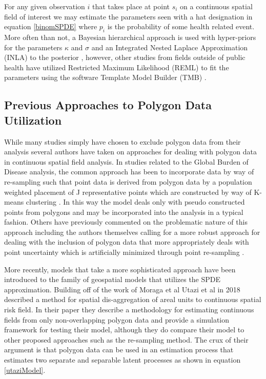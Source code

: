 \documentclass{article}
\begin{document}
For any given observation $i$ that takes place at point $s_i$ on a continuous spatial field of interest we may estimate the parameters seen with a hat designation in equation \ref{binomSPDE} where $p_i$ is the probability of some health related event. More often than not, a Bayesian hierarchical approach is used with hyper-priors for the parameters $\kappa$ and $\sigma$ \cite{Burke2016, Reiner2018, Utazi2018a, Wakefield2017} and an Integrated Nested Laplace Approximation (INLA) to the posterior \cite{Rue2009}, however, other studies from fields outside of public health have utilized Restricted Maximum Likelihood (REML) to fit the parameters \cite{Gruss2018} using the software Template Model Builder (TMB) \cite{Kristensen2016a}.

\subsection{Previous Approaches to Polygon Data Utilization}

While many studies simply have chosen to exclude polygon data from their analysis several authors have taken on approaches for dealing with polygon data in continuous spatial field analysis. In studies related to the Global Burden of Disease analysis, the common approach has been to incorporate data by way of re-sampling such that point data is derived from polygon data by a population weighted placement of J representative points which are constructed by way of K-means clustering \cite{Golding2017, Reiner2018}. In this way the model deals only with pseudo constructed points from polygons and may be incorporated into the analysis in a typical fashion. Others have previously commented on the problematic nature of this approach \cite{Wakefield2017} including the authors themselves calling for a more robust approach for dealing with the inclusion of polygon data that more appropriately deals with point uncertainty which is artificially minimized through point re-sampling \cite{Golding2017}.

More recently, models that take a more sophisticated approach have been introduced to the family of geospatial models that utilizes the SPDE approximation. Building off of the work of Moraga et al \cite{Moraga2017} Utazi et al in 2018 described a method for spatial dis-aggregation of areal units to continuous spatial risk field. In their paper they describe a methodology for estimating continuous fields from only non-overlapping polygon data and provide a simulation framework for testing their model, although they do compare their model to other proposed approaches such as the re-sampling method. The crux of their argument is that polygon data can be used in an estimation process that estimates two separate and separable latent processes as shown in equation \ref{utaziModel}.
\end{document}
